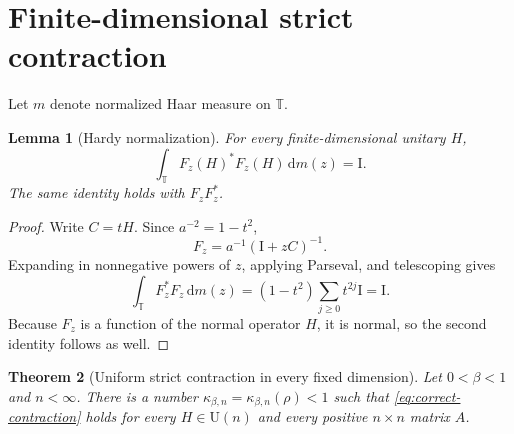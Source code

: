 \documentclass[11pt]{article}
\newtheorem{theorem}{Theorem}[section]
\newtheorem{lemma}[theorem]{Lemma}
\theoremstyle{remark}
\newcommand{\T}{\mathbb T}
\newcommand{\Id}{\mathrm I}
\newcommand{\dd}{\,\mathrm d}
\newcommand{\U}{\mathrm U}
\begin{document}
\section{Finite-dimensional strict contraction}

Let $m$ denote normalized Haar measure on $\T$.

\begin{lemma}[Hardy normalization]
\label{lem:hardy}
For every finite-dimensional unitary $H$,
\begin{equation}
 \int_\T F_z(H)^*F_z(H)\dd m(z)=\Id.
 \label{eq:hardy}
\end{equation}
The same identity holds with $F_zF_z^*$.
\end{lemma}

\begin{proof}
Write $C=tH$.  Since $a^{-2}=1-t^2$,
\[
 F_z=a^{-1}(\Id+zC)^{-1}.
\]
Expanding in nonnegative powers of $z$, applying Parseval, and telescoping
gives
\[
 \int_\T F_z^*F_z\dd m(z)
 =(1-t^2)\sum_{j\geq0}t^{2j}\Id=\Id.
\]
Because $F_z$ is a function of the normal operator $H$, it is normal, so the
second identity follows as well.
\end{proof}

\begin{theorem}[Uniform strict contraction in every fixed dimension]
\label{thm:finite-contraction}
Let $0<\beta<1$ and $n<\infty$.  There is a number
$\kappa_{\beta,n}=\kappa_{\beta,n}(\rho)<1$ such that
\eqref{eq:correct-contraction} holds for every $H\in\U(n)$ and every
positive $n\times n$ matrix $A$.
\end{theorem}
\end{document}
